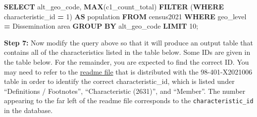 \documentclass[
]{book}
\newenvironment{Shaded}{\begin{snugshade}}{\end{snugshade}}
\newcommand{\DecValTok}[1]{\textcolor[rgb]{0.00,0.00,0.81}{#1}}
\newcommand{\FunctionTok}[1]{\textcolor[rgb]{0.13,0.29,0.53}{\textbf{#1}}}
\newcommand{\KeywordTok}[1]{\textcolor[rgb]{0.13,0.29,0.53}{\textbf{#1}}}
\newcommand{\NormalTok}[1]{#1}
\newcommand{\OperatorTok}[1]{\textcolor[rgb]{0.81,0.36,0.00}{\textbf{#1}}}
\newcommand{\StringTok}[1]{\textcolor[rgb]{0.31,0.60,0.02}{#1}}
\begin{document}
\begin{Shaded}
\begin{Highlighting}[]
\KeywordTok{SELECT}\NormalTok{ alt\_geo\_code, }\FunctionTok{MAX}\NormalTok{(c1\_count\_total) }\KeywordTok{FILTER}\NormalTok{ (}\KeywordTok{WHERE}\NormalTok{ characteristic\_id }\OperatorTok{=} \DecValTok{1}\NormalTok{) }\KeywordTok{AS}\NormalTok{ population }
\KeywordTok{FROM}\NormalTok{ census2021 }
\KeywordTok{WHERE}\NormalTok{ geo\_level }\OperatorTok{=} \StringTok{\textquotesingle{}Dissemination area\textquotesingle{}} 
\KeywordTok{GROUP} \KeywordTok{BY}\NormalTok{ alt\_geo\_code }
\KeywordTok{LIMIT} \DecValTok{10}\NormalTok{;}
\end{Highlighting}
\end{Shaded}

\textbf{Step 7:} Now modify the query above so that it will produce an output table that contains all of the characteristics listed in the table below. Some IDs are given in the table below. For the remainder, you are expected to find the correct ID. You may need to refer to the \href{./data/98-401-X2021006_English_meta.txt}{readme file} that is distributed with the 98-401-X2021006 table in order to identify the correct characteristic\_id, which is listed under ``Definitions / Footnotes'', ``Characteristic (2631)'', and ``Member''. The number appearing to the far left of the readme file corresponds to the \texttt{characteristic\_id} in the database.
\end{document}

